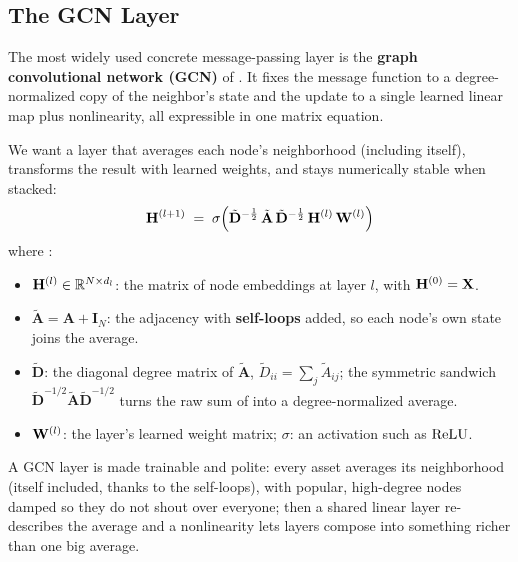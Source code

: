 \subsection{The GCN Layer}\label{sec:gnn:gcn}

The most widely used concrete message-passing layer is the \textbf{graph convolutional network (GCN)} of \citet{KipfWelling2017}. It fixes the message function to a degree-normalized copy of the neighbor's state and the update to a single learned linear map plus nonlinearity, all expressible in one matrix equation.

We want a layer that averages each node's neighborhood (including itself), transforms the result with learned weights, and stays numerically stable when stacked:
\begin{equation}\label{eq:gnn:gcn}
  \mathbf{H}^{(l+1)} \;=\; \sigma\!\left( \tilde{\mathbf{D}}^{-\frac{1}{2}}\, \tilde{\mathbf{A}}\, \tilde{\mathbf{D}}^{-\frac{1}{2}}\, \mathbf{H}^{(l)}\, \mathbf{W}^{(l)} \right)
\end{equation}
where \citep[eq.~2, p.~2]{KipfWelling2017}:
\begin{itemize}[nosep]
  \item $\mathbf{H}^{(l)} \in \mathbb{R}^{N \times d_l}$: the matrix of node embeddings at layer $l$, with $\mathbf{H}^{(0)} = \mathbf{X}$.
  \item $\tilde{\mathbf{A}} = \mathbf{A} + \mathbf{I}_N$: the adjacency with \textbf{self-loops} added, so each node's own state joins the average.
  \item $\tilde{\mathbf{D}}$: the diagonal degree matrix of $\tilde{\mathbf{A}}$, $\tilde{D}_{ii} = \sum_j \tilde{A}_{ij}$; the symmetric sandwich $\tilde{\mathbf{D}}^{-1/2}\tilde{\mathbf{A}}\tilde{\mathbf{D}}^{-1/2}$ turns the raw sum of  into a degree-normalized average.
  \item $\mathbf{W}^{(l)}$: the layer's learned weight matrix; $\sigma$: an activation such as $\operatorname{ReLU}$.
\end{itemize}

\begin{intuition}
A GCN layer is  made trainable and polite: every asset averages its neighborhood (itself included, thanks to the self-loops), with popular, high-degree nodes damped so they do not shout over everyone; then a shared linear layer re-describes the average and a nonlinearity lets layers compose into something richer than one big average.
\end{intuition}

